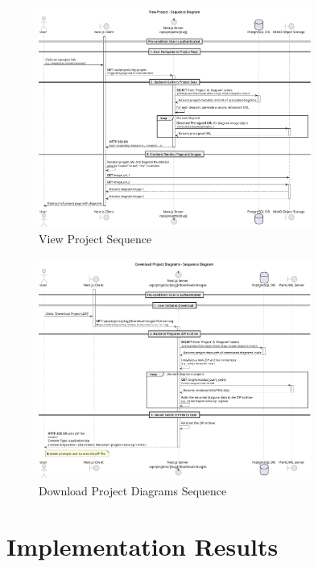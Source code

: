 \begin{figure}[H]
\centering
\includegraphics[width=0.8\textwidth]{conception/SprintIII/sequence_diagrams/sequence_projectManagement_3_2_ViewProjectDetails.png}
\caption{View Project Sequence}
\label{fig:seq_view_project}
\end{figure}

\begin{figure}[H]
\centering
\includegraphics[width=0.8\textwidth]{conception/SprintIII/sequence_diagrams/sequence_projectManagement_3_5_DownloadProjectDiagramsAsZip.png}
\caption{Download Project Diagrams Sequence}
\label{fig:seq_download_project}
\end{figure}

\section{Implementation Results}

